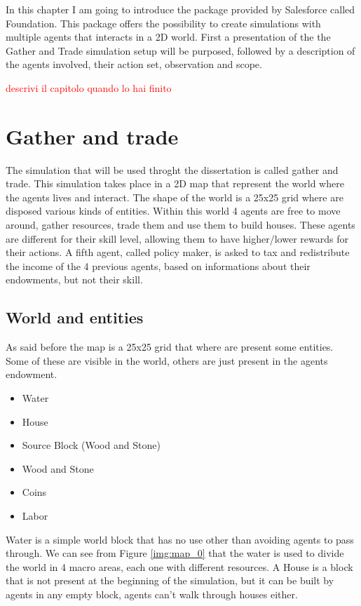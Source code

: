 In this chapter I am going to introduce the package provided by Salesforce called Foundation. This package offers the possibility to create simulations with multiple agents that interacts in a 2D world. First a presentation of the the Gather and Trade simulation setup will be purposed, followed by a description of the agents involved, their action set, observation and scope.

\textcolor{red}{descrivi il capitolo quando lo hai finito}

\section{Gather and trade}

The simulation that will be used throght the dissertation is called gather and trade. This simulation takes place in a 2D map that represent the world where the agents lives and interact. The shape of the world is a 25x25 grid where are disposed various kinds of entities. Within this world 4 agents are free to move around, gather resources, trade them and use them to build houses. These agents are different for their skill level, allowing them to have higher/lower rewards for their actions. A fifth agent, called policy maker, is asked to tax and redistribute the income of the 4 previous agents, based on informations about their endowments, but not their skill.

\subsection{World and entities}

As said before the map is a 25x25 grid that where are present some entities. Some of these are visible in the world, others are just present in the agents endowment.

\begin{itemize}
    \item Water
    \item House
    \item Source Block (Wood and Stone)
    \item Wood and Stone
    \item Coins
    \item Labor
\end{itemize}


Water is a simple world block that has no use other than avoiding agents to pass through. We can see from Figure \ref{img:map_0} that the water is used to divide the world in 4 macro areas, each one with different resources. 
A House is a block that is not present at the beginning of the simulation, but it can be built by agents in any empty block, agents can't walk through houses either.


